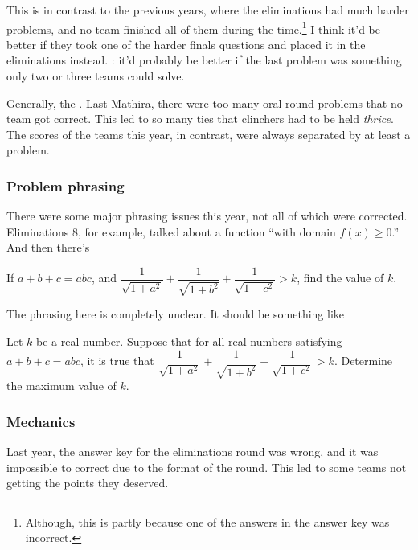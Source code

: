 \documentclass[11pt,paper=letter]{scrartcl}
\begin{document}
This is in contrast to the previous years, where the eliminations had much harder problems, and no team finished all of them during the time.\footnote{Although, this is partly because one of the answers in the answer key was incorrect.} I think it'd be better if they took one of the harder finals questions and placed it in the eliminations instead. : it'd probably be better if the last problem was something only two or three teams could solve.

Generally, the . Last Mathira, there were too many oral round problems that no team got correct. This led to so many ties that clinchers had to be held \emph{thrice}. The scores of the teams this year, in contrast, were always separated by at least a problem.

\subsubsection*{Problem phrasing}

There were some major phrasing issues this year, not all of which were corrected. Eliminations 8, for example, talked about a function ``with domain $f(x) \geq 0$.'' And then there's

\begin{probboxed}
  [Finals W4-3] If $a + b + c = abc$, and $\dfrac1{\sqrt{1 + a^2}} + \dfrac1{\sqrt{1 + b^2}} + \dfrac1{\sqrt{1 + c^2}} > k$, find the value of $k$.
\end{probboxed}

The phrasing here is completely unclear. It should be something like

\begin{probboxed}
  Let $k$ be a real number. Suppose that for all real numbers satisfying $a + b + c = abc$, it is true that $\dfrac1{\sqrt{1 + a^2}} + \dfrac1{\sqrt{1 + b^2}} + \dfrac1{\sqrt{1 + c^2}} > k$. Determine the maximum value of $k$.
\end{probboxed}

\subsubsection*{Mechanics}

 Last year, the answer key for the eliminations round was wrong, and it was impossible to correct due to the format of the round. This led to some teams not getting the points they deserved.
\end{document}
